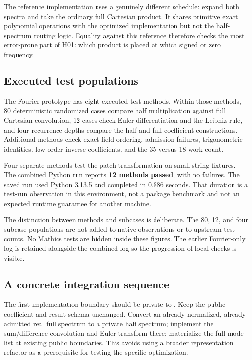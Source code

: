 \documentclass[11pt,letterpaper]{article}
\newcommand{\code}[1]{\texttt{\small\detokenize{#1}}}
\begin{document}
The reference implementation uses a genuinely different schedule: expand both spectra and take the ordinary full Cartesian product. It shares primitive exact polynomial operations with the optimized implementation but not the half-spectrum routing logic. Equality against this reference therefore checks the most error-prone part of H01: which product is placed at which signed or zero frequency.

\subsection{Executed test populations}
The Fourier prototype has eight executed test methods. Within those methods, 80 deterministic randomized cases compare half multiplication against full Cartesian convolution, 12 cases check Euler differentiation and the Leibniz rule, and four recurrence depths compare the half and full coefficient constructions. Additional methods check exact field ordering, admission failures, trigonometric identities, low-order inverse coefficients, and the 35-versus-18 work count.

Four separate methods test the patch transformation on small string fixtures. The combined Python run reports \textbf{12 methods passed}, with no failures. The saved run used Python 3.13.5 and completed in 0.886 seconds. That duration is a test-run observation in this environment, not a package benchmark and not an expected runtime guarantee for another machine.

The distinction between methods and subcases is deliberate. The 80, 12, and four subcase populations are not added to native observations or to upstream test counts. No Mathics tests are hidden inside these figures. The earlier Fourier-only log is retained alongside the combined log so the progression of local checks is visible.

\subsection{A concrete integration sequence}
The first implementation boundary should be private to \code{FourierCoefficients.wl}. Keep the public coefficient and result schema unchanged. Convert an already normalized, already admitted real full spectrum to a private half spectrum; implement the sum/difference convolution and Euler transform there; materialize the full mode list at existing public boundaries. This avoids using a broader representation refactor as a prerequisite for testing the specific optimization.
\end{document}

